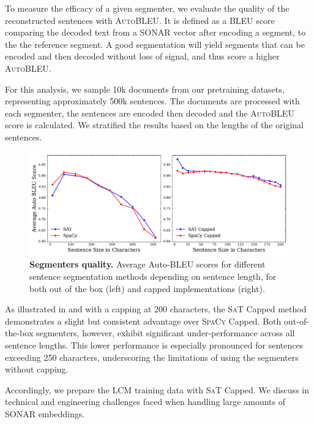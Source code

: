 \documentclass[twoside,11pt]{fairmeta}
\newcommand{\segmenter}{segmenter\xspace}
\newcommand{\segmenters}{segmenters\xspace}
\newcommand{\spacy}{\textsc{SpaCy}\xspace}
\newcommand{\sat}{\textsc{SaT}\xspace}
\newcommand{\sonar}{\textsc{SONAR}\xspace}
\newcommand{\lcm}{\textsc{LCM}\xspace}
\newcommand{\bleu}{\textsc{BLEU}\xspace}
\newcommand{\autobleu}{\textsc{AutoBLEU}\xspace}
\begin{document}
To measure the efficacy of a given \segmenter,
we evaluate the quality of the reconstructed sentences with \autobleu. 
It is defined as a \bleu score~\citep{papineni2002bleu} comparing 
the decoded text from a \sonar vector after encoding a segment,
to the the reference segment.  
A good segmentation will yield segments that can be encoded and then decoded without loss of signal, and thus score a higher \autobleu.

For this analysis, we sample 10k documents from our pretraining datasets, representing approximately 500k sentences. 
The documents are processed with each \segmenter, the sentences are encoded then decoded and the \autobleu score is calculated.
We stratified the results based on the lengths of the original sentences.

\begin{figure}[!htb]
    \centering
    \includegraphics[width=.855\linewidth]{figures/segmentation_bleu_score_new.pdf}
     
    \caption{\textbf{Segmenters quality.} Average Auto-BLEU scores for different sentence segmentation methods depending on sentence length, for both out of the box (left) and capped implementations (right).
    }
    \label{fig:sent_segmentation}
\end{figure}

As illustrated in  and with a capping at 200 characters, the \sat Capped method demonstrates a slight but consistent advantage over \spacy Capped. 
Both out-of-the-box \segmenters, however, exhibit significant under-performance across all sentence lengths.
This lower performance is especially pronounced for sentences exceeding 250 characters, underscoring the limitations of using the \segmenters without capping.




Accordingly, we prepare the \lcm training  data with \sat Capped. 
We discuss in  technical and engineering challenges faced when handling large amounts of \sonar embeddings.
\end{document}
